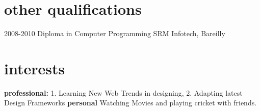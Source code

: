 \documentclass[]{cv-style}          %
\begin{document}

\section{other qualifications}

\begin{entrylist}
\entry
{2008-2010}
{Diploma in Computer Programming}
{SRM Infotech, Bareilly}
{\vspace{-0.3cm}}

\end{entrylist}


\section{interests}
  \vspace{-0.2cm}

\textbf{professional:} 1. Learning New Web Trends in designing, 2. Adapting latest Design Frameworks \textbf{personal} Watching Movies and playing cricket with friends.

\end{document}

